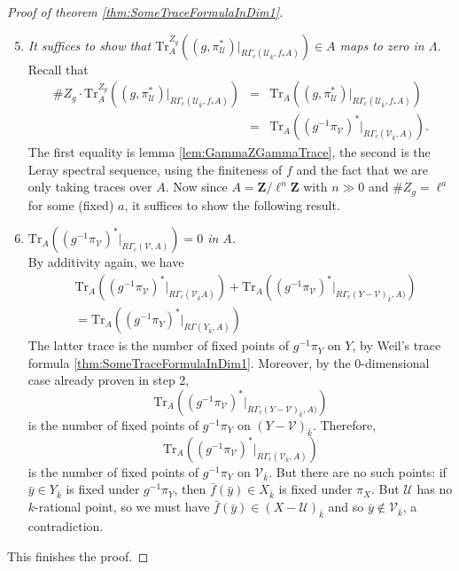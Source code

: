 \begin{proof}[Proof of theorem \ref{thm:SomeTraceFormulaInDim1}]
\begin{enumerate}
\setcounter{enumi}{4}
\item 
{\it  
It suffices to show that  $\text{Tr}_A^{Z_g}\left((g, 
\pi_\mathcal{U}^*)\big|_{R\Gamma_c(\mathcal{U}_{\bar k}, f_*A)}\right) \in A$ 
maps to zero in $\Lambda$. 
}\\
Recall that 
\begin{eqnarray*}
\# Z_g \cdot \text{Tr}_A^{Z_g}\left((g, 
\pi_\mathcal{U}^*)\big|_{R\Gamma_c(\mathcal{U}_{\bar k}, f_*A)}\right) 
& = & \text{Tr}_A\left((g, \pi_\mathcal{U}^*)\big|_{R\Gamma_c(\mathcal{U}_{\bar 
k}, f_*A)}\right)\\
& = & 
\text{Tr}_A\left((g^{-1}\pi_\mathcal{V})^*\big|_{R\Gamma_c(\mathcal{V}_{\bar 
k}, A)}\right).
\end{eqnarray*}
The first equality is lemma \ref{lem:GammaZGammaTrace}, the second is the Leray 
spectral sequence, using the finiteness of $f$ and the fact that we are only 
taking traces over $A$. Now since $A=\mathbf{Z}/\ell^n\mathbf{Z}$ with $n\gg 0$ 
and $\# Z_g=\ell^a$ for some (fixed) $a$, it suffices to show the following 
result.
\item
{\it $\text{Tr}_A\left((g^{-1}\pi_\mathcal{V})^*\big|_{R\Gamma_c(\mathcal{V}, 
A)}\right) = 0$ in $A$.} \\
By additivity again, we have
\begin{eqnarray*}
&
\text{Tr}_A
\left(
(g^{-1}\pi_\mathcal{V})^*\big|_{R\Gamma_c(\mathcal{V}_{\bar k} A)}
\right)
+
\text{Tr}_A
\left(
(g^{-1}\pi_\mathcal{V})^*\big|_{R\Gamma_c(Y-\mathcal {V})_{\bar k}, A)}
\right) \\
&
=
\text{Tr}_A
\left(
(g^{-1}\pi_Y)^*\big|_{R\Gamma(Y_{\bar k}, A)}
\right)
\end{eqnarray*}
The latter trace is the number of fixed points of $g^{-1}\pi_Y$ on $Y$, by 
Weil's trace formula \ref{thm:SomeTraceFormulaInDim1}. Moreover, by the 
0-dimensional case already proven in step 2, 
$$
\text{Tr}_A\left((g^{-1}\pi_\mathcal{V})^*\big|_{R\Gamma_c(Y-\mathcal{V})_{\bar 
k}, A)}\right)
$$ 
is the number of fixed points of $g^{-1}\pi_Y$ on $(Y-\mathcal{V})_{\bar k}$. 
Therefore, 
$$
\text{Tr}_A\left((g^{-1}\pi_\mathcal{V})^*\big|_{R\Gamma_c(\mathcal{V}_{\bar 
k}, A)}\right)
$$ 
is the number of fixed points of $g^{-1}\pi_Y$ on $\mathcal{V}_{\bar k}$. But 
there are no such points: if $\bar y\in Y_{\bar k}$ is fixed under 
$g^{-1}\pi_Y$, then $\bar f(\bar y) \in X_{\bar k}$ is fixed under $\pi_X$. But 
$\mathcal{U}$ has no $k$-rational point, so we must have $\bar f(\bar y)\in 
(X-\mathcal{U})_{\bar k}$ and so $\bar y\notin \mathcal{V}_{\bar k}$, a 
contradiction. 
\end{enumerate}
This finishes the proof.
\end{proof}

